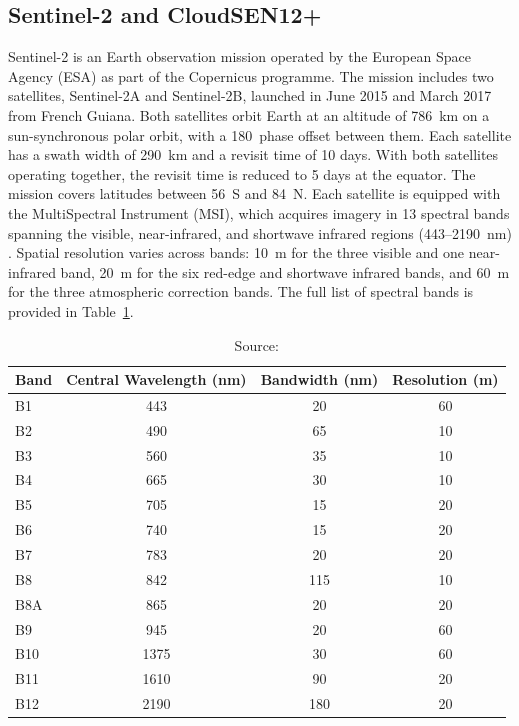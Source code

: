 \subsection{Sentinel-2 and CloudSEN12+}
\label{sec:dataset_s2}

Sentinel-2 is an Earth observation mission operated by the European Space Agency (ESA) as part of the Copernicus programme. The mission includes two satellites, Sentinel-2A and Sentinel-2B, launched in June 2015 and March 2017 from French Guiana. Both satellites orbit Earth at an altitude of 786~km on a sun-synchronous polar orbit, with a 180\textdegree~phase offset between them. Each satellite has a swath width of 290~km and a revisit time of 10 days. With both satellites operating together, the revisit time is reduced to 5 days at the equator. The mission covers latitudes between 56\textdegree~S and 84\textdegree~N. Each satellite is equipped with the MultiSpectral Instrument (MSI), which acquires imagery in 13 spectral bands spanning the visible, near-infrared, and shortwave infrared regions (443--2190~nm) \cite{drusch2012}. Spatial resolution varies across bands: 10~m for the three visible and one near-infrared band, 20~m for the six red-edge and shortwave infrared bands, and 60~m for the three atmospheric correction bands. The full list of spectral bands is provided in Table~\ref{tab:s2_bands}.

\begin{table}[H]
\small
\centering
\caption{Spectral bands of the Sentinel-2 MSI.} \caption*{Source: \cite{drusch2012}}
\label{tab:s2_bands}
\begin{tabular}{lccc}

\toprule
\textbf{Band} & \textbf{Central Wavelength (nm)} & \textbf{Bandwidth (nm)} & \textbf{Resolution (m)} \\
\midrule
B1  & 443  & 20  & 60 \\
B2  & 490  & 65  & 10 \\
B3  & 560  & 35  & 10 \\
B4  & 665  & 30  & 10 \\
B5  & 705  & 15  & 20 \\
B6  & 740  & 15  & 20 \\
B7  & 783  & 20  & 20 \\
B8  & 842  & 115 & 10 \\
B8A & 865  & 20  & 20 \\
B9  & 945  & 20  & 60 \\
B10 & 1375 & 30  & 60 \\
B11 & 1610 & 90  & 20 \\
B12 & 2190 & 180 & 20 \\
\bottomrule
\end{tabular}
\end{table}

